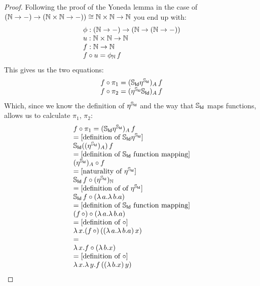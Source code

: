 \documentclass{article}
\begin{document}
\begin{proof}
Following the proof of the Yoneda lemma in the case of $(\nat \to -) \to (\nat \times \nat \to -)) \cong \nat \times \nat \to \nat$ you end up with:
$$
\begin{array}{ll}
    \phi : (\nat \to -) \to (\nat \to (\nat \to -)) \\
    u : \nat \times \nat \to \nat \\
    f : \nat \to \nat \\
    f \comp u = \phi_\nat\,f
\end{array}
$$
This gives us the two equations:
 $$
\begin{array}{ll}
    f \comp \pi_1 = (\stream{\Id}\eta^{\stream{\Id}})_A\, f \\
    f \comp \pi_2 = (\eta^{\stream{\Id}}\stream{\Id})_A\, f \\
\end{array}
$$
Which, since we know the definition of $\eta^{\stream{\Id}}$ and the way that $\stream{\Id}$ maps functions, allows us to calculate $\pi_1$, $\pi_2$:
$$
\begin{array}{ll}
    f \comp \pi_1 = (\stream{\Id}\eta^{\stream{\Id}})_A\, f \\
    = \text{[definition of $\stream{\Id}\eta^{\stream{\Id}}$]} \\
    \stream{\Id}((\eta^{\stream{\Id}})_A)\, f \\
    = \text{[definition of $\stream{\Id}$ function mapping]} \\
    (\eta^{\stream{\Id}})_A \comp f  \\
    = \text{[naturality of $\eta^{\stream{\Id}}$]} \\
    \stream{\Id}\,f \comp (\eta^{\stream{\Id}})_\nat \\
    = \text{[definition of of $\eta^{\stream{\Id}}$]} \\
    \stream{\Id}\,f \comp (\lambda\,a.\lambda\,b.a) \\
    = \text{[definition of $\stream{\Id}$ function mapping]} \\
    (f\,\comp) \comp (\lambda\,a.\lambda\,b.a) \\
    = \text{[definition of $\comp$]} \\
    \lambda\,x.(f\,\comp)\,((\lambda\,a.\lambda\,b.a)\,x) \\
    = \\
    \lambda\,x.f \comp (\lambda\,b.x) \\
    = \text{[definition of $\comp$]} \\
    \lambda\,x.\lambda\,y. f\,((\lambda\,b.x)\, y) \\

\end{array}$$
\end{proof}
\end{document}
